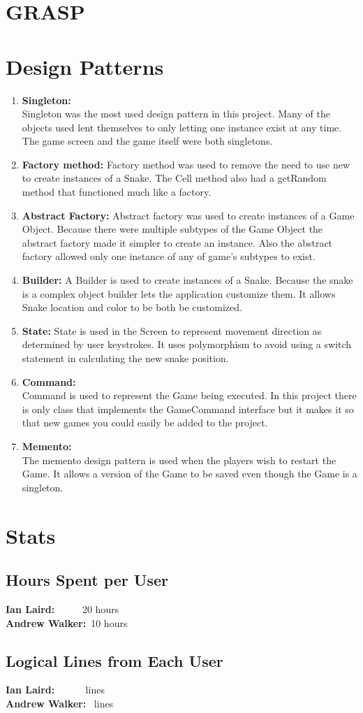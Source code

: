 \documentclass[titlepage]{article}
\begin{document}
	\section{GRASP}
	
	\section{Design Patterns}
		\begin{enumerate}
			\item \textbf{Singleton:}\\
				Singleton was the most used design pattern in this project. Many of the objects used lent themselves to only letting one instance exist at any
				time. The game screen and the game itself were both singletons.
			\item \textbf{Factory method:}
				Factory method was used to remove the need to use new to create instances of a Snake. The Cell method also had a getRandom method that functioned much like a factory.
			\item \textbf{Abstract Factory:}
				Abstract factory was used to create instances of a Game Object. Because there were multiple subtypes of the Game Object the abstract factory made it simpler to create an instance. Also the abstract factory allowed only one instance of any of game's subtypes to exist.
			\item \textbf{Builder:}
				A Builder is used to create instances of a Snake. Because the snake is a complex object builder lets the application customize them. It allows Snake location and color to be both be customized.
			\item \textbf{State:}
				State is used in the Screen to represent movement direction as determined by user keystrokes. It uses polymorphism to avoid using a switch statement in calculating the new snake position.
			\item \textbf{Command:}\\
				Command is used to represent the Game being executed. In this project there is only class that implements the GameCommand interface but it makes it so that new games you could easily be added to the project.
			\item \textbf{Memento:}\\
				The memento design pattern is used when the players wish to restart the Game. It allows a version of the Game to be saved even though the Game is a singleton.
		\end{enumerate}
	\section{Stats}
	\subsection{Hours Spent per User}
	\textbf{Ian Laird:} ~~~~~20 hours\\
	\textbf{Andrew Walker:}~10 hours
	\subsection{Logical Lines from Each User}
	\textbf{Ian Laird:} ~~~~~ lines\\
	\textbf{Andrew Walker:}~ lines
\end{document}
